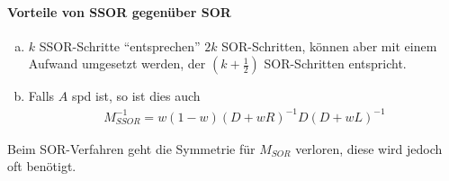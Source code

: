 \paragraph{Vorteile von SSOR gegenüber SOR}
\begin{enumerate}[a)]
\item $k$ SSOR-Schritte \enquote{entsprechen} $2k$ SOR-Schritten,
  können aber mit einem Aufwand umgesetzt werden, 
  der $(k+\frac{1}{2})$ SOR-Schritten entspricht.
\item Falls $A$ spd ist, so ist dies auch
  \begin{gather}
    M_{SSOR}^{-1} = w(1-w)(D+wR)^{-1}D(D+wL)^{-1}
    \label{IX.4.7}
  \end{gather}
\end{enumerate}
Beim SOR-Verfahren geht die Symmetrie für $M_{SOR}$ verloren,
diese wird jedoch oft benötigt.



